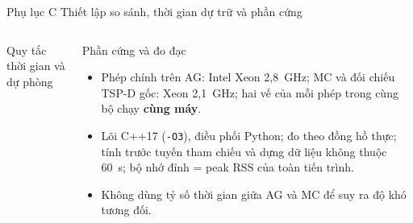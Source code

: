 \documentclass[aspectratio=169,10pt,t,xcolor={table}]{beamer}
\newcommand{\apptitle}[2]{Phụ lục #1 \textperiodcentered{} #2}
\begin{document}
\begin{frame}[label=appC]{\apptitle{C}{Thiết lập so sánh, thời gian dự trữ và phần cứng}}
\begin{columns}[T,onlytextwidth]
\begin{block}{Quy tắc thời gian và dự phòng}
\begin{itemize}
\end{itemize}
\end{block}
\begin{block}{Phần cứng và đo đạc}
\scriptsize
\begin{itemize}
\item Phép chính trên AG: Intel Xeon 2,8~GHz; MC và đối chiếu TSP-D gốc: Xeon 2,1~GHz; hai vế của mỗi phép trong cùng bộ chạy \textbf{cùng máy}.
\item Lõi C++17 (\texttt{-O3}), điều phối Python; đo theo đồng hồ thực; tính trước tuyến tham chiếu và dựng dữ liệu không thuộc 60~s; bộ nhớ đỉnh = peak RSS của toàn tiến trình.
\item Không dùng tỷ số thời gian giữa AG và MC để suy ra độ khó tương đối.
\end{itemize}
\end{block}
\end{columns}
\end{frame}
\end{document}

